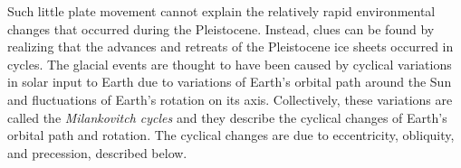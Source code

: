 \documentclass{tufte-handout}
\begin{document}
Such little plate movement cannot explain the relatively rapid environmental changes that occurred during the Pleistocene.  Instead, clues can be found by realizing that the advances and retreats of the Pleistocene ice sheets occurred in cycles.  The glacial events are thought to have been caused by cyclical variations in solar input to Earth due to variations of Earth's orbital path around the Sun and fluctuations of Earth's rotation on its axis.  Collectively, these variations are called the \textit{Milankovitch cycles} and they describe the cyclical changes of Earth's orbital path and rotation. The cyclical changes are due to eccentricity, obliquity, and precession, described below.
\end{document}

